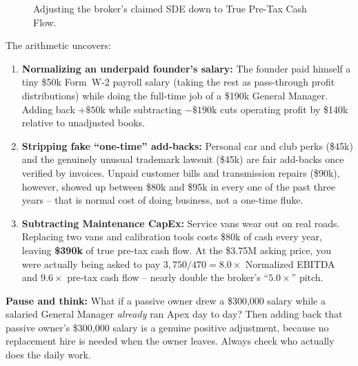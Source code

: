 \begin{figure}[htbp]
\caption{Adjusting the broker's claimed SDE down to True Pre-Tax Cash Flow.}
\label{fig:ch04-apex-bridge}
\end{figure}

The arithmetic uncovers:
\begin{enumerate}
  \item \textbf{Normalizing an underpaid founder's salary:} The founder paid himself a tiny \$50k Form~W-2 payroll salary (taking the rest as pass-through profit distributions) while doing the full-time job of a \$190k General Manager. Adding back $+\$50\text{k}$ while subtracting $-\$190\text{k}$ cuts operating profit by \$140k relative to unadjusted books.
  \item \textbf{Stripping fake ``one-time'' add-backs:} Personal car and club perks (\$45k) and the genuinely unusual trademark lawsuit (\$45k) are fair add-backs once verified by invoices. Unpaid customer bills and transmission repairs (\$90k), however, showed up between \$80k and \$95k in every one of the past three years -- that is normal cost of doing business, not a one-time fluke.
  \item \textbf{Subtracting Maintenance CapEx:} Service vans wear out on real roads. Replacing two vans and calibration tools costs \$80k of cash every year, leaving \textbf{\$390k} of true pre-tax cash flow. At the \$3.75M asking price, you were actually being asked to pay $3{,}750 / 470 = \mathbf{8.0\times}$ Normalized EBITDA and $\mathbf{9.6\times}$ pre-tax cash flow -- nearly double the broker's ``$5.0\times$'' pitch.
\end{enumerate}

\begin{recoverybox}
\textbf{Pause and think:} What if a passive owner drew a \$300,000 salary while a salaried General Manager \emph{already} ran Apex day to day? Then adding back that passive owner's \$300,000 salary is a genuine positive adjustment, because no replacement hire is needed when the owner leaves. Always check who actually does the daily work.
\end{recoverybox}


